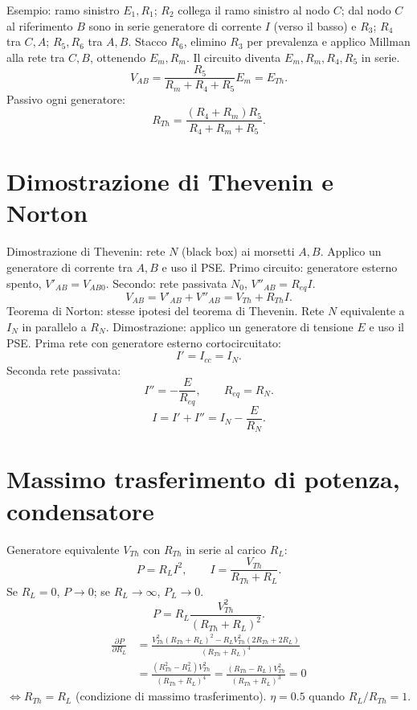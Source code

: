 \documentclass[11pt,a4paper]{article}
\newcommand{\pagina}[2]{\clearpage\section*{#2}}
\begin{document}
Esempio: ramo sinistro $E_1,R_1$; $R_2$ collega il ramo sinistro al nodo $C$; dal nodo $C$ al riferimento $B$ sono in serie generatore di corrente $I$ (verso il basso) e $R_3$; $R_4$ tra $C,A$; $R_5,R_6$ tra $A,B$. Stacco $R_6$, elimino $R_3$ per prevalenza e applico Millman alla rete tra $C,B$, ottenendo $E_m,R_m$. Il circuito diventa $E_m,R_m,R_4,R_5$ in serie.
\[V_{AB}=\frac{R_5}{R_m+R_4+R_5}E_m=E_{Th}.\]
Passivo ogni generatore:
\[R_{Th}=\frac{(R_4+R_m)R_5}{R_4+R_m+R_5}.\]
\pagina{14}{Dimostrazione di Thevenin e Norton}
Dimostrazione di Thevenin: rete $N$ (black box) ai morsetti $A,B$. Applico un generatore di corrente tra $A,B$ e uso il PSE. Primo circuito: generatore esterno spento, $V'_{AB}=V_{AB0}$. Secondo: rete passivata $N_0$, $V''_{AB}=R_{eq}I$.
\[V_{AB}=V'_{AB}+V''_{AB}=V_{Th}+R_{Th}I.\]
Teorema di Norton: stesse ipotesi del teorema di Thevenin. Rete $N$ equivalente a $I_N$ in parallelo a $R_N$. Dimostrazione: applico un generatore di tensione $E$ e uso il PSE. Prima rete con generatore esterno cortocircuitato:
\[I'=I_{cc}=I_N.\]
Seconda rete passivata:
\[I''=-\frac E{R_{eq}},\qquad R_{eq}=R_N.\]
\[I=I'+I''=I_N-\frac E{R_N}.\]
\pagina{15}{Massimo trasferimento di potenza, condensatore}
Generatore equivalente $V_{Th}$ con $R_{Th}$ in serie al carico $R_L$:
\[P=R_LI^2,\qquad I=\frac{V_{Th}}{R_{Th}+R_L}.\]
Se $R_L=0$, $P\to0$; se $R_L\to\infty$, $P_L\to0$.
\[P=R_L\frac{V_{Th}^2}{(R_{Th}+R_L)^2}.\]
\begin{align*}\frac{\partial P}{\partial R_L}&=\frac{V_{Th}^2(R_{Th}+R_L)^2-R_LV_{Th}^2(2R_{Th}+2R_L)}{(R_{Th}+R_L)^4}\\&=\frac{(R_{Th}^2-R_L^2)V_{Th}^2}{(R_{Th}+R_L)^4}=\frac{(R_{Th}-R_L)V_{Th}^2}{(R_{Th}+R_L)^3}=0\end{align*}
$\Leftrightarrow R_{Th}=R_L$ (condizione di massimo trasferimento). $\eta=0.5$ quando $R_L/R_{Th}=1$.
\end{document}
